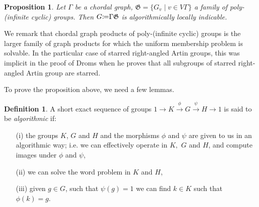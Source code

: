 \documentclass[12pt, a4paper]{amsart}
\newtheorem{Prop}[Thm]{Proposition}
\theoremstyle{remark}
\theoremstyle{definition}
\newtheorem{Def}[Thm]{Definition}
\begin{document}
\begin{Prop}\label{prop:chordal} Let ${\Gamma}$ be a chordal graph, $\mathfrak{G}=\{G_v\mid v\in V{\Gamma}\}$ a family of poly-(infinite cyclic) groups. Then $G{\mathrel{\mathop\mathchar"303A}\mkern-1.2mu=}{\Gamma} \mathfrak{G}$ is algorithmically locally indicable. 
\end{Prop}

We remark that chordal graph products of poly-(infinite cyclic) groups is the larger family of graph products for which the uniform membership problem is solvable. In the particular case of starred right-angled Artin groups, this was implicit in the proof of Droms \cite[Theorem]{Droms} when he proves that all subgroups of starred right-angled Artin group are starred.

To prove the proposition above, we need a few lemmas. 

\begin{Def}
A short exact sequence of groups
$1\to K\stackrel{\phi}{\to} G\stackrel{\psi}{\to} H\to 1$
is said to be {\it algorithmic} if:
\begin{enumerate}
\item[(i)] the groups $K$, $G$ and $H$ and the
morphisms $\phi$ and $\psi$ are given to us in an algorithmic way; i.e. we can effectively
operate in $K,$ $G$ and $H$, and compute images under $\phi$ and $\psi$, 
\item[(ii)] we can solve the word problem in $K$ and $H$,
\item[(iii)]  given $g\in G$, such that $\psi(g)=1$ we can find $k\in K$ such that $\phi(k)=g$. 
\end{enumerate}
\end{Def}
\end{document}
